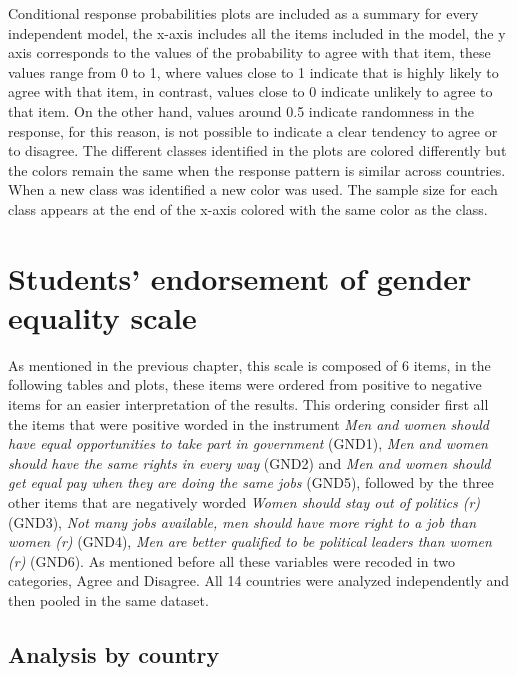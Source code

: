 \documentclass[12pt,a4paper,oneside]{reedthesis}
\begin{document}
Conditional response probabilities plots are included as a summary for every independent model, the x-axis includes all the items included in the model, the y axis corresponds to the values of the probability to agree with that item, these values range from 0 to 1, where values close to 1 indicate that is highly likely to agree with that item, in contrast, values close to 0 indicate unlikely to agree to that item. On the other hand, values around 0.5 indicate randomness in the response, for this reason, is not possible to indicate a clear tendency to agree or to disagree. The different classes identified in the plots are colored differently but the colors remain the same when the response pattern is similar across countries. When a new class was identified a new color was used. The sample size for each class appears at the end of the x-axis colored with the same color as the class.

\hypertarget{students-endorsement-of-gender-equality-scale}{%
\section{Students' endorsement of gender equality scale}\label{students-endorsement-of-gender-equality-scale}}

As mentioned in the previous chapter, this scale is composed of 6 items, in the following tables and plots, these items were ordered from positive to negative items for an easier interpretation of the results. This ordering consider first all the items that were positive worded in the instrument \emph{Men and women should have equal opportunities to take part in government} (GND1), \emph{Men and women should have the same rights in every way} (GND2) and \emph{Men and women should get equal pay when they are doing the same jobs} (GND5), followed by the three other items that are negatively worded \emph{Women should stay out of politics (r)} (GND3), \emph{Not many jobs available, men should have more right to a job than women (r)} (GND4), \emph{Men are better qualified to be political leaders than women (r)} (GND6). As mentioned before all these variables were recoded in two categories, Agree and Disagree. All 14 countries were analyzed independently and then pooled in the same dataset.

\hypertarget{analysis-by-country}{%
\subsection{Analysis by country}\label{analysis-by-country}}
\end{document}
